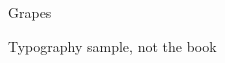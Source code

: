 \documentclass[11pt,twoside,openright]{book}
\begin{document}
\frontmatter
\begin{titlepage}
  \centering
  \vspace*{0.3\textheight}
  {\Huge Grapes}\par\bigskip
  {\large Typography sample, not the book}\par
  \vfill
\end{titlepage}

\mainmatter

\end{document}
